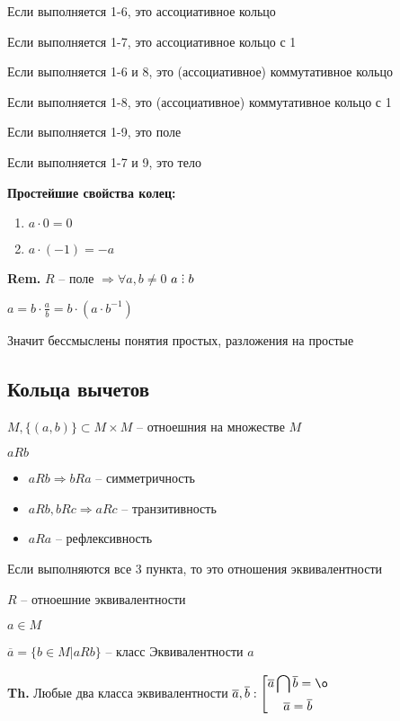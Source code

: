 \documentclass[14pt, letter paper]{article}
\DeclareRobustCommand{\divby}{%
  \mathrel{\text{\vbox{\baselineskip.65ex\lineskiplimit0pt\hbox{.}\hbox{.}\hbox{.}}}}%
}
\begin{document}
Если выполняется 1-6, это ассоциативное кольцо

Если выполняется 1-7, это ассоциативное кольцо с 1

Если выполняется 1-6 и 8, это (ассоциативное) коммутативное кольцо

Если выполняется 1-8, это (ассоциативное) коммутативное кольцо с 1

Если выполняется 1-9, это поле

Если выполняется 1-7 и 9, это тело

\textbf{Простейшие свойства колец:}

\begin{enumerate}
    \item $a \cdot 0 = 0$
    \item $a \cdot (-1) = -a$
\end{enumerate}

\textbf{Rem.} $R$ -- поле $\Rightarrow \forall a, b \neq 0$ $a \divby b$

$a = b \cdot \frac{a}{b} = b \cdot (a \cdot b^{-1})$

Значит бессмыслены понятия простых, разложения на простые

\begin{center}
    \section*{Кольца вычетов}
\end{center}

$M, \{ (a, b) \} \subset M \times M$ -- отноешния на множестве $M$

$aRb$

\begin{itemize}
    \item $aRb \Rightarrow bRa$ -- симметричность
    \item $aRb, bRc \Rightarrow aRc$ -- транзитивность
    \item $aRa$ -- рефлексивность
\end{itemize}

Если выполняются все 3 пункта, то это отношения эквивалентности

$R$ -- отноешние эквивалентности

$a \in M$

$\overline{a} = \{b \in M | aRb \}$ -- класс Эквивалентности $a$

\textbf{Th.} Любые два класса эквивалентности $\overline{a}, \overline{b} : \left[ \begin{gathered}
    \overline{a} \bigcap \overline{b} = \o \\
    \overline{a} = \overline{b}
\end{gathered} \right.$
\end{document}
